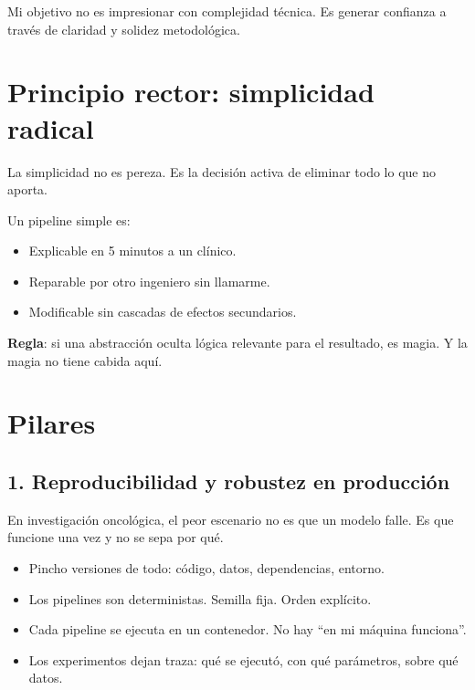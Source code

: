 \documentclass[11pt]{article}
\begin{document}
\vspace{0.5em}

\begin{sloppypar}
Mi objetivo no es impresionar con complejidad técnica. Es generar confianza a través de claridad y solidez metodo\-lógica.
\end{sloppypar}

\section*{Principio rector: simplicidad radical}

La simplicidad no es pereza. Es la decisión activa de eliminar todo lo que no aporta.

Un pipeline simple es:
\begin{itemize}[label=\textendash]
  \item Explicable en 5 minutos a un clínico.
  \item Reparable por otro ingeniero sin llamarme.
  \item Modificable sin cascadas de efectos secundarios.
\end{itemize}

\textbf{Regla}: si una abstracción oculta lógica relevante para el resultado, es magia. Y la magia no tiene cabida aquí.

\section*{Pilares}

\subsection*{1. Reproducibilidad y robustez en producción}

En investigación oncológica, el peor escenario no es que un modelo falle. Es que funcione una vez y no se sepa por qué.

\begin{itemize}[label=\textendash]
  \item Pincho versiones de todo: código, datos, dependencias, entorno.
  \item Los pipelines son deterministas. Semilla fija. Orden explícito.
  \item Cada pipeline se ejecuta en un contenedor. No hay \enquote{en mi máquina funciona}.
  \item Los experimentos dejan traza: qué se ejecutó, con qué parámetros, sobre qué datos.
\end{itemize}
\end{document}
